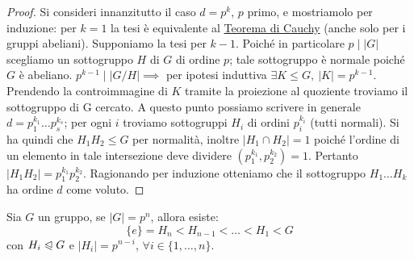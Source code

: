 \documentclass[11pt]{scrartcl}
\begin{document}
\begin{proof}
    Si consideri innanzitutto il caso $d=p^k$, $p$ primo, e mostriamolo per induzione:
    per $k=1$ la tesi è equivalente al \hyperref[p:Cauchy]{Teorema di Cauchy} (anche solo per i gruppi abeliani).
    Supponiamo la tesi per $k-1$. Poiché in particolare $p\mid |G|$ scegliamo un sottogruppo $H$ di $G$ di ordine $p$;
    tale sottogruppo è normale poiché $G$ è abeliano. $p^{k-1}\mid |G/H|\implies$ per ipotesi induttiva $\exists K\leqslant G,\ |K|=p^{k-1}$. \\
    Prendendo la controimmagine di $K$ tramite la proiezione al quoziente troviamo il sottogruppo di G cercato. A questo punto possiamo scrivere in generale
    $d=p_1^{k_1}\ldots p_s^{k_s}$; per ogni $i$ troviamo sottogruppi $H_i$ di ordini $p_i^{k_i}$ (tutti normali). Si ha quindi che $H_1H_2\leqslant G$ per normalità,
    inoltre $|H_1\cap H_2|=1$ poiché l'ordine di un elemento in tale intersezione deve dividere $(p_1^{k_1}, p_2^{k_2})=1$. Pertanto $|H_1H_2|=p_1^{k_1}p_2^{k_2}$.
    Ragionando per induzione otteniamo che il sottogruppo $H_1\ldots H_k$ ha ordine $d$ come voluto.
\end{proof}

\newpage

\begin{exercise}
    Sia $G$ un gruppo, se $|G| = p^n$, allora esiste:
        \[ \{e\} = H_n < H_{n-1} < \ldots < H_1 < G
            \]
    con $H_i \trianglelefteqslant G$ e $|H_i| = p^{n-i}$, $\forall i \in \{1,\ldots,n\}$.
\end{exercise}
\end{document}
